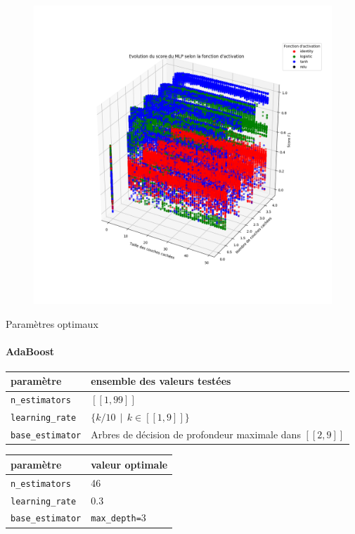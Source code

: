 \documentclass[usenames,dvipsnames]{beamer}
\begin{document}
\begin{frame}
\begin{figure}
\centering
\includegraphics[width=.7\textwidth]{img/mlp_activation.png}
\end{figure}
\end{frame}

\begin{frame}{Paramètres optimaux}
\framesubtitle{AdaBoost}
\begin{table}
\tiny
\centering
\begin{tabular}{l l}
paramètre & ensemble des valeurs testées \\
\hline
\texttt{n\_estimators} & $[\![1, 99]\!]$ \\
\texttt{learning\_rate} & $\{k/10 \>\> | \>\> k \in [\![1, 9]\!] \}$ \\
\texttt{base\_estimator} & Arbres de décision de profondeur maximale dans $[\![2, 9]\!]$ \\
\end{tabular}
\end{table}

\begin{table}
\centering
\begin{tabular}{l l}
paramètre & valeur optimale \\
\hline
\texttt{n\_estimators} & 46\\
\texttt{learning\_rate} & 0.3 \\
\texttt{base\_estimator} & \texttt{max\_depth=}3\\
\end{tabular}
\end{table}

\end{frame}
\end{document}
